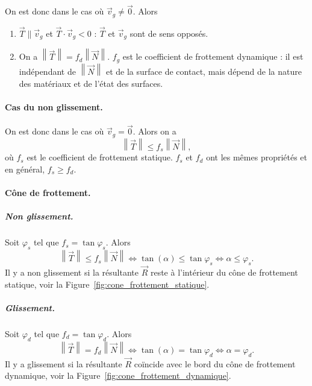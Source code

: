             On est donc dans le cas où $\vec{v}_g\neq\vec{0}$. Alors
            \begin{enumerate}
                \item $\vec{T}\parallel\vec{v}_g$ et $\vec{T}\cdot\vec{v}_g<0$ : $\vec{T}$ et $\vec{v}_g$ sont de sens opposés.
                \item On a $\left\lVert\vec{T}\right\rVert=f_d\left\lVert\vec{N}\right\rVert$. $f_g$ est le coefficient de frottement dynamique : il est indépendant de $\left\lVert\vec{N}\right\rVert$ et de la surface de contact, mais dépend de la nature des matériaux et de l'état des surfaces.
            \end{enumerate}

        \paragraph{Cas du non glissement.} 
        
            On est donc dans le cas où $\vec{v}_g=\vec{0}$. Alors on a
            \begin{equation}
                \left\lVert\vec{T}\right\rVert\leqslant f_s\left\lVert\vec{N}\right\rVert,
            \end{equation}
            où $f_s$ est le coefficient de frottement statique. $f_s$ et $f_d$ ont les mêmes propriétés et en général, $f_s\geqslant f_d$.


        \paragraph{Cône de frottement.}

            \subparagraph{Non glissement.} Soit $\varphi_{s}$ tel que $f_s=\tan\varphi_s$. Alors 
            \begin{equation}
                \left\lVert\vec{T}\right\rVert\leqslant f_s\left\lVert\vec{N}\right\rVert\Leftrightarrow\tan(\alpha)\leqslant\tan\varphi_s\Leftrightarrow\alpha\leqslant\varphi_s.
            \end{equation}
            Il y a non glissement si la résultante $\vec{R}$ reste à l'intérieur du cône de frottement statique, voir la Figure~\ref{fig:cone_frottement_statique}.

            \subparagraph{Glissement.} Soit $\varphi_{d}$ tel que $f_d=\tan\varphi_d$. Alors 
            \begin{equation}
                \left\lVert\vec{T}\right\rVert= f_d\left\lVert\vec{N}\right\rVert\Leftrightarrow\tan(\alpha)=\tan\varphi_d\Leftrightarrow\alpha=\varphi_d.
            \end{equation}
            Il y a glissement si la résultante $\vec{R}$ coïncide avec le bord du cône de frottement dynamique, voir la Figure~\ref{fig:cone_frottement_dynamique}.

